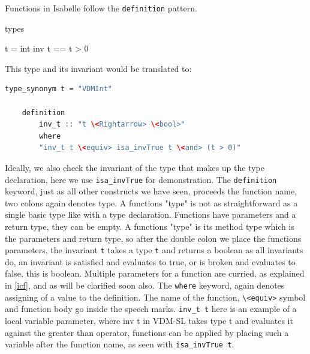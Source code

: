 	Functions in Isabelle follow the \lstinline[language=Isabelle]{definition} pattern.
	\begin{vdmsl}
	types

	t = int
	inv t == t > 0
	\end{vdmsl}
	This type and its invariant would be translated to:
	\begin{lstlisting}[language=Java]
	type_synonym t = "VDMInt"

	definition
		inv_t :: "t \<Rightarrow> \<bool>"
	    where
	    "inv_t t \<equiv> isa_invTrue t \<and> (t > 0)"
	\end{lstlisting}

	Ideally, we also check the invariant of the type that makes up the type declaration, here we use  \lstinline[language=Isabelle]{isa_invTrue} for demonstration. The  \lstinline[language=Isabelle]{definition} keyword, just as all other constructs we have seen, proceeds the function name, two colons again denotes type. A functions "type" is not as straightforward as a single basic type like with a type declaration. Functions have parameters and a return type, they can be empty. A functions "type" is its method type which is the parameters and return type, so after the double colon we place the functions parameters, the invariant  \lstinline[language=Isabelle]{t} takes a type  \lstinline[language=Isabelle]{t} and returns a boolean as all invariants do, an invariant is satisfied and evaluates to true, or is broken and evaluates to false, this is boolean. Multiple parameters for a function are curried, as explained in \ref{icf}, and as will be clarified soon also. The  \lstinline[language=Isabelle]{where} keyword, again denotes assigning of a value to the definition. The name of the function,  \lstinline[language=Isabelle]{\<equiv>} symbol and function body go inside the speech marks.  \lstinline[language=Isabelle]{inv_t t} here is an example of a local variable parameter, where inv t in VDM-SL takes type t and evaluates it against the greater than operator, functions can be applied by placing such a variable after the function name, as seen with  \lstinline[language=Isabelle]{isa_invTrue t}.

